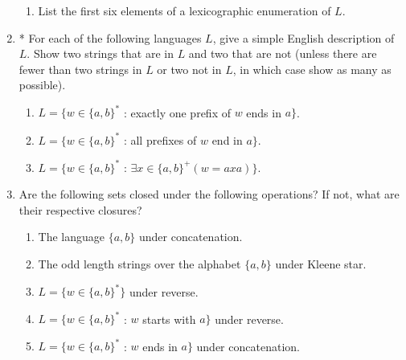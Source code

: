 \documentclass[10pt]{article}
\begin{document}
\begin{enumerate}
\begin{enumerate}
\item
List the first six elements of a lexicographic enumeration of $L$.
\end{enumerate}


\item
* For each of the following languages $L$, give a simple English description of $L$.  Show two strings that are in $L$ and two that are not (unless there are fewer than two strings in $L$ or two not in $L$, in which case show as many as possible).
\begin{enumerate}

\item
$L = \{w \in \{a, b\}^*$ : exactly one prefix of $w$ ends in $a\}$. 

\item
$L = \{w \in \{a, b\}^*$ : all prefixes of $w$ end in $a\}$.

\item
$L = \{w \in \{a, b\}^*$ : $\exists x \in \{a, b\}^+ (w = axa)\}$.
\end{enumerate}


\item
Are the following sets closed under the following operations?  If not, what are their respective closures?
\begin{enumerate}

\item
The language $\{a, b\}$ under concatenation.

\item
The odd length strings over the alphabet $\{a, b\}$ under Kleene star.

\item
$L = \{w \in \{a, b\}^*\}$ under reverse.

\item
$L = \{w \in \{a, b\}^*$ : $w$ starts with $a\}$ under reverse.

\item
$L = \{w \in \{a, b\}^*$ : $w$ ends in $a\}$ under concatenation.
\end{enumerate}
\end{enumerate}

\pagebreak
 
\end{document}
